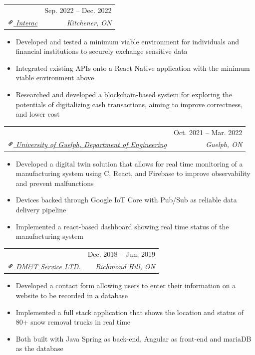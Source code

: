 \documentclass[letterpaper, 10pt]{report}
\makeatletter
\newcommand{\resumeSubheading}[4]{
    \begin{tabular*}{\textwidth}[t]{l@{\extracolsep{\fill}}r}
        \textbf{#1}       & #2                \\
        \textit{\small#3} & \textit{\small#4} \\
    \end{tabular*}\vspace{-0.7em}
}
\newenvironment{ResumeItem}{
    \vspace{-0.3em}
    \begin{itemize}
        \setlength\itemsep{-0.3em}
        }{
    \end{itemize}\vspace{-0.3em}}
\newcommand{\cxx}{C\nolinebreak\hspace{-.05em}\raisebox{0.03ex}{\bf +}\nolinebreak\hspace{-.05em}\raisebox{.03ex}{\bf +}}
\newcommand{\linkIcon}{\includegraphics[height=9pt, trim=0 5cm 0 -1.5cm]{./img/link-icon}}
\makeatother
\begin{document}
    \resumeSubheading
    {\color{Black}{Software Developer, Co-op}}{Sep. 2022 -- Dec. 2022}
    {\href{https://www.interac.ca/en/}{\linkIcon{} Interac}}{Kitchener, ON}
    \begin{ResumeItem}
        \item{Developed and tested a minimum viable environment for individuals and financial institutions to securely exchange sensitive data}
        \item{Integrated existing APIs onto a React Native application with the minimum viable environment above}
        \item{Researched and developed a blockchain-based system for exploring the potentials of digitalizing cash transactions, aiming to improve correctness, and lower cost}
    \end{ResumeItem}


    \resumeSubheading
    {\color{Black}{Undergraduate Research Assistant}} {Oct. 2021 -- Mar. 2022}
    {\href{https://www.uoguelph.ca/engineering/}{\linkIcon{} University of Guelph, Department of Engineering}}{Guelph, ON}

    \begin{ResumeItem}
        \item{Developed a digital twin solution that allows for real time monitoring of a manufacturing system using \cxx, React, and Firebase to improve observability and prevent malfunctions}
        \item{Devices backed through Google IoT Core with Pub/Sub as reliable data delivery pipeline}
        \item{Implemented a react-based dashboard showing real time status of the manufacturing system}
    \end{ResumeItem}



    \resumeSubheading
    {\color{Black}{Software Developer, Co-op}}{Dec. 2018 -- Jun. 2019}
    {\href{https://www.dmtserv.com/}{\linkIcon{} DM\&T Service LTD.}}{Richmond Hill, ON}
    \begin{ResumeItem}
        \item{Developed a contact form allowing users to enter their information on a website to be recorded in a database}
        \item{Implemented a full stack application that shows the location and status of 80+ snow removal trucks in real time}
        \item{Both built with Java Spring as back-end, Angular as front-end and mariaDB as the database}
    \end{ResumeItem}
\end{document}
